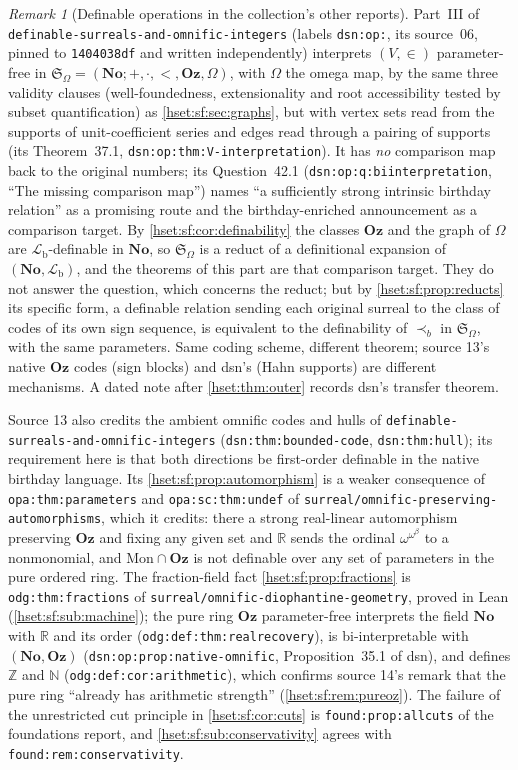 \documentclass[11pt,letterpaper]{article}
\theoremstyle{definition}
\theoremstyle{remark}
\newtheorem{remark}[remark]{Remark}\aliascntresetthe{remark}
\newcommand{\No}{\mathbf{No}}
\newcommand{\lbl}[1]{\nolinkurl{#1}}
\newcommand{\repo}[1]{\nolinkurl{#1}}
\newcommand{\Oz}{\mathbf{Oz}}
\newcommand{\R}{\mathbb R}
\newcommand{\Z}{\mathbb Z}
\newcommand{\N}{\mathbb N}
\newcommand{\precb}{\prec_b}
\newcommand{\Lb}{\mathcal L_{\mathrm b}}
\begin{document}
\begin{remark}[Definable operations in the collection's other reports]
\label{hset:sf:rem:dsn}
Part~III of \repo{definable-surreals-and-omnific-integers} (labels
\lbl{dsn:op:}, its source~06, pinned to \texttt{1404038df} and written
independently) interprets $(V,\in)$ parameter-free in
$\mathfrak S_\Omega=(\No;+,\cdot,<,\Oz,\Omega)$, with $\Omega$ the omega map, by the
same three validity clauses (well-foundedness, extensionality and root
accessibility tested by subset quantification) as \cref{hset:sf:sec:graphs}, but
with vertex sets read from the supports of unit-coefficient series and edges read
through a pairing of supports (its Theorem~37.1, \lbl{dsn:op:thm:V-interpretation}).
It has \emph{no} comparison map back to the original numbers; its
Question~42.1 (\lbl{dsn:op:q:biinterpretation}, ``The missing comparison map'')
names ``a sufficiently strong intrinsic birthday relation'' as a promising route
and the birthday-enriched announcement as a comparison target. By
\cref{hset:sf:cor:definability} the classes $\Oz$ and the graph of $\Omega$ are
$\Lb$-definable in $\No$, so $\mathfrak S_\Omega$ is a reduct of a definitional
expansion of $(\No,\Lb)$, and the theorems of this part are that comparison
target. They do not answer the question, which concerns the reduct; but by
\cref{hset:sf:prop:reducts} its specific form, a definable relation sending each
original surreal to the class of codes of its own sign sequence, is equivalent to
the definability of $\precb$ in $\mathfrak S_\Omega$, with the same parameters.
Same coding scheme, different theorem; source 13's native $\Oz$ codes (sign
blocks) and dsn's (Hahn supports) are different mechanisms. A dated note after
\cref{hset:thm:outer} records dsn's transfer theorem.

Source 13 also credits the ambient omnific codes and hulls of
\repo{definable-surreals-and-omnific-integers} (\lbl{dsn:thm:bounded-code},
\lbl{dsn:thm:hull}); its requirement here is that both directions be first-order
definable in the native birthday language. Its \cref{hset:sf:prop:automorphism}
is a weaker consequence of \lbl{opa:thm:parameters} and \lbl{opa:sc:thm:undef} of
\repo{surreal/omnific-preserving-automorphisms}, which it credits: there a strong
real-linear automorphism preserving $\Oz$ and fixing any given set and $\R$ sends
the ordinal $\omega^{\omega^\beta}$ to a nonmonomial, and $\mathrm{Mon}\cap\Oz$ is not
definable over any set of parameters in the pure ordered ring. The fraction-field
fact \cref{hset:sf:prop:fractions} is \lbl{odg:thm:fractions} of
\repo{surreal/omnific-diophantine-geometry}, proved in Lean
(\cref{hset:sf:sub:machine}); the pure ring $\Oz$ parameter-free interprets the
field $\No$ with $\R$ and its order (\lbl{odg:def:thm:realrecovery}), is
bi-interpretable with $(\No,\Oz)$ (\lbl{dsn:op:prop:native-omnific}, Proposition~35.1
of dsn), and defines $\Z$ and $\N$ (\lbl{odg:def:cor:arithmetic}), which confirms
source 14's remark that the pure ring ``already has arithmetic strength''
(\cref{hset:sf:rem:pureoz}). The failure of the unrestricted cut principle in
\cref{hset:sf:cor:cuts} is \lbl{found:prop:allcuts} of the foundations report,
and \cref{hset:sf:sub:conservativity} agrees with \lbl{found:rem:conservativity}.
\end{remark}
\end{document}
